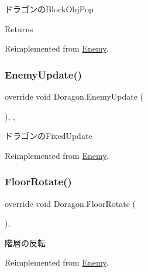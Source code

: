ドラゴンの\+Block\+Obj\+Pop 

\begin{DoxyReturn}{Returns}

\end{DoxyReturn}


Reimplemented from \hyperlink{class_enemy_ab56d4c134b6fc007e07e6825b04f11a5}{Enemy}.

\mbox{\label{class_doragon_abf6c6c47805aa970c8dac34b61f38719}} 
\subsubsection{\texorpdfstring{Enemy\+Update()}{EnemyUpdate()}}
{\footnotesize\ttfamily override void Doragon.\+Enemy\+Update (\begin{DoxyParamCaption}{ }\end{DoxyParamCaption})\hspace{0.3cm}{\ttfamily [inline]}, {\ttfamily [protected]}, {\ttfamily [virtual]}}



ドラゴンの\+Fixed\+Update 



Reimplemented from \hyperlink{class_enemy_ab19a73003a5b443ba93f4b6a45c0abad}{Enemy}.

\mbox{\label{class_doragon_ad83502ad8778d1e9fa0f6d2d72526d85}} 
\subsubsection{\texorpdfstring{Floor\+Rotate()}{FloorRotate()}}
{\footnotesize\ttfamily override void Doragon.\+Floor\+Rotate (\begin{DoxyParamCaption}{ }\end{DoxyParamCaption})\hspace{0.3cm}{\ttfamily [inline]}, {\ttfamily [virtual]}}



階層の反転 



Reimplemented from \hyperlink{class_enemy_add93027b5ee19288ed26aa6f98fb88f8}{Enemy}.

\mbox{\label{class_doragon_a1fcb48ea850873c4b6d19cc3d215d2f5}} 
